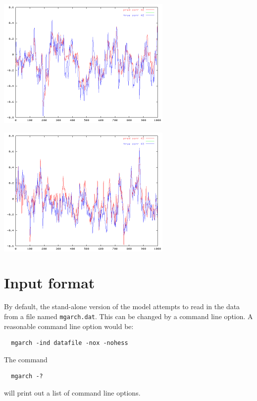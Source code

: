 {\includegraphics[height=2.5in, width=\textwidth]{example/corrplot42.png}


\includegraphics[height=2.5in, width=\textwidth]{example/corrplot43.png}


\bigskip


\section{Input format}

By default, the stand-alone version of the model attempts to read in the
data from a file named \texttt{mgarch.dat}.  This can be changed by a command line option.
A reasonable command line option would be:
\begin{lstlisting}
  mgarch -ind datafile -nox -nohess
\end{lstlisting}
The command
\begin{lstlisting}
  mgarch -?
\end{lstlisting}
will print out a list of command line options.

}
